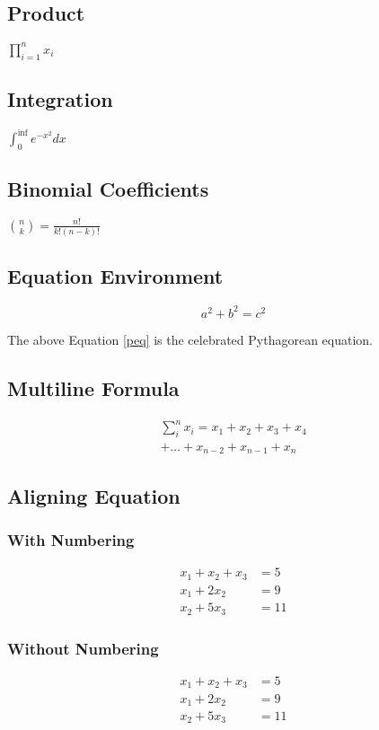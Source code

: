 \subsection{Product}
$\prod_{i=1}^n{x_i}$

\subsection{Integration}
$\int_0^{\inf} e^{-x^2}dx$

\subsection{Binomial Coefficients}
$\binom{n}{k} = \frac{n!}{k!(n-k)!}$

\subsection{Equation Environment}
\begin{equation}
a^2 + b^2 = c^2
\label{peq}
\end{equation}

The above Equation \ref{peq} is the celebrated Pythagorean equation. 

\subsection{Multiline Formula}
\begin{multline}
\sum_i^n x_i = x_1 + x_2 + x_3 + x_4 \\ + 
\ldots + x_{n-2} + x_{n-1} + x_n
\end{multline}

\subsection{Aligning Equation}
\subsubsection{With Numbering}
\begin{align}
x_1 + x_2 + x_3 &= 5 \\
x_1 + 2x_2 & = 9 \\
x_2 + 5x_3 & = 11
\end{align}

\subsubsection{Without Numbering}
\begin{align*}
x_1 + x_2 + x_3 &= 5 \\
x_1 + 2x_2 & = 9 \\
x_2 + 5x_3 & = 11
\end{align*}



